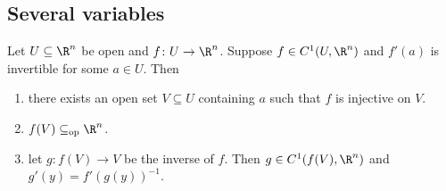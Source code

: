 \subsection{Several variables} \label{sec:ift-sev}
\begin{theorem*} \label{thm:ift}
    Let $U \subseteq \R^n$ be open and $f\colon U \to \R^n$.
    Suppose $f \in C^1(U, \R^n)$ and $f'(a)$ is invertible for some
    $a \in U$.
    Then
    \begin{enumerate}
        \item \label{thm:ift:locally-11}
            there exists an open set $V \subseteq U$ containing $a$ such
            that $f$ is injective on $V$.
        \item \label{thm:ift:open-map}
            $f(V) \subopeneq \R^n$.
        \item \label{thm:ift:inverse}
            let $g\colon f(V) \to V$ be the inverse of $f$.
            Then $g \in C^1(f(V), \R^n)$ and $g'(y) = f'(g(y))^{-1}$.
    \end{enumerate}
\end{theorem*}
